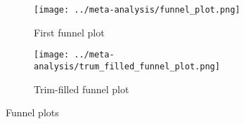 \begin{figure}[p]
\centering

\begin{subfigure}{0.4\textwidth}
\texttt{[image: ../meta-analysis/funnel\_plot.png]}
\caption{First funnel plot}
\label{fig:funnel_plot}
\end{subfigure}

\begin{subfigure}{0.4\textwidth}
\texttt{[image: ../meta-analysis/trum\_filled\_funnel\_plot.png]}
\caption{Trim-filled funnel plot}
\label{fig:trim_filled_funnel_plot}
\end{subfigure}

\caption[Funnel plots]{Funnel plots}

\label{fig:funnels}
\end{figure}
